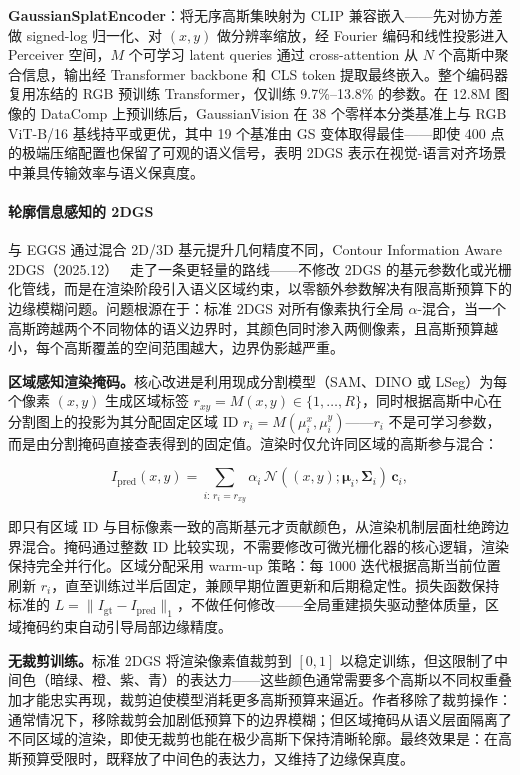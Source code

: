 \textbf{GaussianSplatEncoder}：将无序高斯集映射为 CLIP 兼容嵌入——先对协方差做 signed-log 归一化、对 $(x,y)$ 做分辨率缩放，经 Fourier 编码和线性投影进入 Perceiver 空间，$M$ 个可学习 latent queries 通过 cross-attention 从 $N$ 个高斯中聚合信息，输出经 Transformer backbone 和 CLS token 提取最终嵌入。整个编码器复用冻结的 RGB 预训练 Transformer，仅训练 9.7\%--13.8\% 的参数。在 12.8M 图像的 DataComp 上预训练后，GaussianVision 在 38 个零样本分类基准上与 RGB ViT-B/16 基线持平或更优，其中 19 个基准由 GS 变体取得最佳——即使 400 点的极端压缩配置也保留了可观的语义信号，表明 2DGS 表示在视觉-语言对齐场景中兼具传输效率与语义保真度。

\paragraph{轮廓信息感知的 2DGS}

与 EGGS 通过混合 2D/3D 基元提升几何精度不同，Contour Information Aware 2DGS（2025.12）~\cite{2512_23255} 走了一条更轻量的路线——不修改 2DGS 的基元参数化或光栅化管线，而是在渲染阶段引入语义区域约束，以零额外参数解决有限高斯预算下的边缘模糊问题。问题根源在于：标准 2DGS 对所有像素执行全局 $\alpha$-混合，当一个高斯跨越两个不同物体的语义边界时，其颜色同时渗入两侧像素，且高斯预算越小，每个高斯覆盖的空间范围越大，边界伪影越严重。

\textbf{区域感知渲染掩码。}核心改进是利用现成分割模型（SAM、DINO 或 LSeg）为每个像素 $(x,y)$ 生成区域标签 $r_{xy} = M(x,y) \in \{1, \ldots, R\}$，同时根据高斯中心在分割图上的投影为其分配固定区域 ID $r_i = M(\mu_i^x, \mu_i^y)$——$r_i$ 不是可学习参数，而是由分割掩码直接查表得到的固定值。渲染时仅允许同区域的高斯参与混合：

\begin{equation}
I_{\text{pred}}(x, y) = \sum_{i:\, r_i = r_{xy}} \alpha_i \, \mathcal{N}((x,y); \boldsymbol{\mu}_i, \boldsymbol{\Sigma}_i) \, \mathbf{c}_i,
\end{equation}

即只有区域 ID 与目标像素一致的高斯基元才贡献颜色，从渲染机制层面杜绝跨边界混合。掩码通过整数 ID 比较实现，不需要修改可微光栅化器的核心逻辑，渲染保持完全并行化。区域分配采用 warm-up 策略：每 1000 迭代根据高斯当前位置刷新 $r_i$，直至训练过半后固定，兼顾早期位置更新和后期稳定性。损失函数保持标准的 $L = \|I_{\text{gt}} - I_{\text{pred}}\|_1$，不做任何修改——全局重建损失驱动整体质量，区域掩码约束自动引导局部边缘精度。

\textbf{无裁剪训练。}标准 2DGS 将渲染像素值裁剪到 $[0,1]$ 以稳定训练，但这限制了中间色（暗绿、橙、紫、青）的表达力——这些颜色通常需要多个高斯以不同权重叠加才能忠实再现，裁剪迫使模型消耗更多高斯预算来逼近。作者移除了裁剪操作：通常情况下，移除裁剪会加剧低预算下的边界模糊；但区域掩码从语义层面隔离了不同区域的渲染，即使无裁剪也能在极少高斯下保持清晰轮廓。最终效果是：在高斯预算受限时，既释放了中间色的表达力，又维持了边缘保真度。

